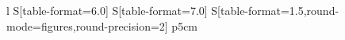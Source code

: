 \begin{tabular}{
    l
    S[table-format=6.0]
    S[table-format=7.0]
    S[table-format=1.5,round-mode=figures,round-precision=2]
    p{5cm}
  }
\end{tabular}
